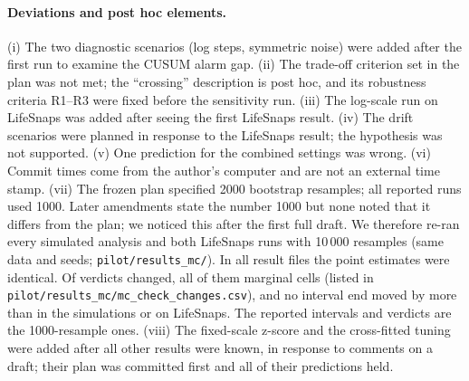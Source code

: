 \documentclass[11pt,a4paper]{article}
\begin{document}
\paragraph{Deviations and post hoc elements.}
(i) The two diagnostic scenarios (log steps, symmetric noise) were added after the first run to examine the CUSUM alarm gap. (ii) The trade-off criterion set in the plan was not met; the ``crossing'' description is post hoc, and its robustness criteria R1--R3 were fixed before the sensitivity run. (iii) The log-scale run on LifeSnaps was added after seeing the first LifeSnaps result. (iv) The drift scenarios were planned in response to the LifeSnaps result; the hypothesis was not supported. (v) One prediction for the combined settings was wrong. (vi) Commit times come from the author's computer and are not an external time stamp. (vii) The frozen plan specified 2000 bootstrap resamples; all reported runs used 1000. Later amendments state the number 1000 but none noted that it differs from the plan; we noticed this after the first full draft. We therefore re-ran every simulated analysis and both LifeSnaps runs with 10\,000 resamples (same data and seeds; \texttt{pilot/results\_mc/}). In all \McFiles{} result files the point estimates were identical. Of \McWithVerdict{} verdicts \McChanges{} changed, all of them marginal cells (listed in \texttt{pilot/results\_mc/mc\_check\_changes.csv}), and no interval end moved by more than \McSimMaxShift{} in the simulations or \McLsMaxShift{} on LifeSnaps. The reported intervals and verdicts are the 1000-resample ones. (viii) The fixed-scale z-score and the cross-fitted tuning were added after all other results were known, in response to comments on a draft; their plan was committed first and all of their predictions held.
\end{document}
